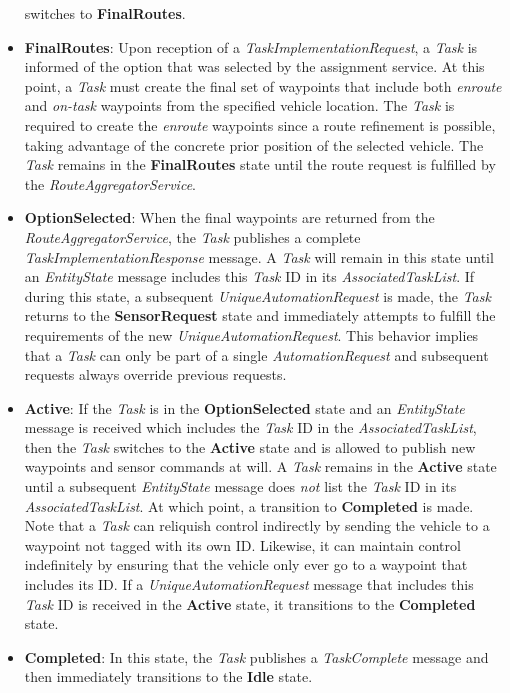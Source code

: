 \begin{itemize}
  switches to \textbf{FinalRoutes}.
\item
  \textbf{FinalRoutes}: Upon reception of a
  \emph{TaskImplementationRequest}, a \emph{Task} is informed of the
  option that was selected by the assignment service. At this point, a
  \emph{Task} must create the final set of waypoints that include both
  \emph{enroute} and \emph{on-task} waypoints from the specified vehicle
  location. The \emph{Task} is required to create the \emph{enroute}
  waypoints since a route refinement is possible, taking advantage of
  the concrete prior position of the selected vehicle. The \emph{Task}
  remains in the \textbf{FinalRoutes} state until the route request is
  fulfilled by the \emph{RouteAggregatorService}.
\item
  \textbf{OptionSelected}: When the final waypoints are returned from
  the \emph{RouteAggregatorService}, the \emph{Task} publishes a
  complete \emph{TaskImplementationResponse} message. A \emph{Task} will
  remain in this state until an \emph{EntityState} message includes this
  \emph{Task} ID in its \emph{AssociatedTaskList}. If during this state,
  a subsequent \emph{UniqueAutomationRequest} is made, the \emph{Task}
  returns to the \textbf{SensorRequest} state and immediately attempts
  to fulfill the requirements of the new \emph{UniqueAutomationRequest}.
  This behavior implies that a \emph{Task} can only be part of a single
  \emph{AutomationRequest} and subsequent requests always override
  previous requests.
\item
  \textbf{Active}: If the \emph{Task} is in the \textbf{OptionSelected}
  state and an \emph{EntityState} message is received which includes the
  \emph{Task} ID in the \emph{AssociatedTaskList}, then the \emph{Task}
  switches to the \textbf{Active} state and is allowed to publish new
  waypoints and sensor commands at will. A \emph{Task} remains in the
  \textbf{Active} state until a subsequent \emph{EntityState} message
  does \emph{not} list the \emph{Task} ID in its
  \emph{AssociatedTaskList}. At which point, a transition to
  \textbf{Completed} is made. Note that a \emph{Task} can reliquish
  control indirectly by sending the vehicle to a waypoint not tagged
  with its own ID. Likewise, it can maintain control indefinitely by
  ensuring that the vehicle only ever go to a waypoint that includes its
  ID. If a \emph{UniqueAutomationRequest} message that includes this
  \emph{Task} ID is received in the \textbf{Active} state, it
  transitions to the \textbf{Completed} state.
\item
  \textbf{Completed}: In this state, the \emph{Task} publishes a
  \emph{TaskComplete} message and then immediately transitions to the
  \textbf{Idle} state.
\end{itemize}

